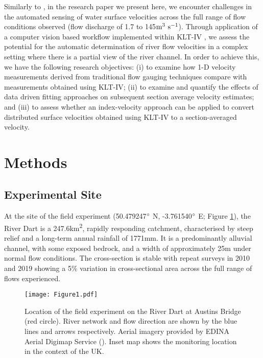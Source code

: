 \documentclass[hess, manuscript]{copernicus}
\begin{document}
Similarly to \citet{Hutley2023}, in the research paper we present here, we encounter challenges in the automated sensing of water surface velocities across the full range of flow conditions observed (flow discharge of 1.7 to 145$\textnormal{m\textsuperscript{3} s\textsuperscript{-1}}$). Through application of a computer vision based workflow implemented within KLT-IV \citep{Perks2020a}, we assess the potential for the automatic determination of river flow velocities in a complex setting where there is a partial view of the river channel. In order to achieve this, we have the following research objectives: (i) to examine how 1-D velocity measurements derived from traditional flow gauging techniques compare with measurements obtained using KLT-IV; (ii) to examine and quantify the effects of data driven fitting approaches on subsequent section average velocity estimates; and (iii) to assess whether an index-velocity approach can be applied to convert distributed surface velocities obtained using KLT-IV to a section-averaged velocity.

\section{Methods}
\subsection{Experimental Site}
At the site of the field experiment (50.479247$\degree$ N, -3.761540$\degree$ E; Figure \ref{Figure1}), the River Dart is a 247.6km\textsuperscript{2}, rapidly responding catchment, characterised by steep relief and a long-term annual rainfall of 1771mm. It is a predominantly alluvial channel, with some exposed bedrock, and a width of approximately 25m under normal flow conditions. The cross-section is stable with repeat surveys in 2010 and 2019 showing a 5\% variation in cross-sectional area across the full range of flows experienced.

\begin{figure}[!htb]
\centering 
\texttt{[image: Figure1.pdf]}
\caption{Location of the field experiment on the River Dart at Austins Bridge (red circle). River network and flow direction are shown by the blue lines and arrows respectively. Aerial imagery provided by EDINA Aerial Digimap Service (\citeyear{EDINA2022}). Inset map shows the monitoring location in the context of the UK.}
\label{Figure1} 
\end{figure}
\end{document}
